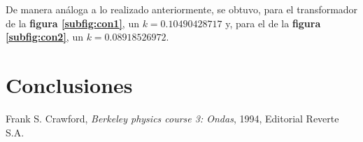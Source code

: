 \documentclass[11pt,a4paper]{article}
\begin{document}
De manera análoga a lo realizado anteriormente, se obtuvo, para el transformador de la \textbf{figura \ref{subfig:con1}}, un $k=0.10490428717$ y, para el de la \textbf{figura \ref{subfig:con2}}, un $k=0.08918526972$.





\section{Conclusiones}
\label{sec:conclusiones}










\begin{thebibliography}{1}
  Frank S. Crawford, \textit{Berkeley physics course 3: Ondas}, 1994, Editorial Reverte S.A.
\end{thebibliography}
 
\end{document}
